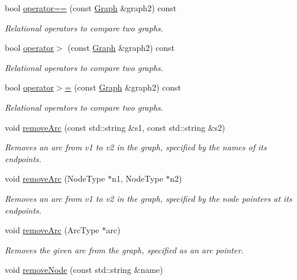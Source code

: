 \begin{DoxyCompactItemize}
bool \mbox{\hyperlink{classGraph_a188f85939e3fe6ed2d411f622287f722}{operator==}} (const \mbox{\hyperlink{classGraph}{Graph}} \&graph2) const
\begin{DoxyCompactList}\small\item\em Relational operators to compare two graphs. \end{DoxyCompactList}\item 
bool \mbox{\hyperlink{classGraph_a8019cf2c98949fd509193cf26ba2ff8a}{operator$>$}} (const \mbox{\hyperlink{classGraph}{Graph}} \&graph2) const
\begin{DoxyCompactList}\small\item\em Relational operators to compare two graphs. \end{DoxyCompactList}\item 
bool \mbox{\hyperlink{classGraph_ab1ca2af20f3b0251972b72295270212e}{operator$>$=}} (const \mbox{\hyperlink{classGraph}{Graph}} \&graph2) const
\begin{DoxyCompactList}\small\item\em Relational operators to compare two graphs. \end{DoxyCompactList}\item 
void \mbox{\hyperlink{classGraph_af6370fb52d2dab4eb7795da22c33dd02}{remove\+Arc}} (const std\+::string \&s1, const std\+::string \&s2)
\begin{DoxyCompactList}\small\item\em Removes an arc from v1 to v2 in the graph, specified by the names of its endpoints. \end{DoxyCompactList}\item 
void \mbox{\hyperlink{classGraph_ae0c9f44b20b49ffae9fecc0a4f156ac1}{remove\+Arc}} (Node\+Type $\ast$n1, Node\+Type $\ast$n2)
\begin{DoxyCompactList}\small\item\em Removes an arc from v1 to v2 in the graph, specified by the node pointers at its endpoints. \end{DoxyCompactList}\item 
void \mbox{\hyperlink{classGraph_a9d6580d1b0228fe6c1a02dfe70de1abf}{remove\+Arc}} (Arc\+Type $\ast$arc)
\begin{DoxyCompactList}\small\item\em Removes the given arc from the graph, specified as an arc pointer. \end{DoxyCompactList}\item 
void \mbox{\hyperlink{classGraph_a2d5f7ee89176144ed4c5c6b08a233aa6}{remove\+Node}} (const std\+::string \&name)

\end{DoxyCompactItemize}
